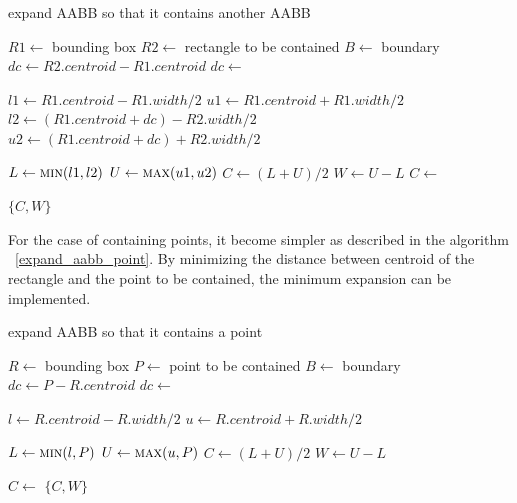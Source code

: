 \documentclass[10pt,letterpaper,twocolumn]{article}
\begin{document}
\begin{algorithm}
    \caption{expand AABB so that it contains another AABB}
    \label{expand_aabb_aabb}
    \begin{algorithmic}
        \State $R1 \gets$ bounding box
        \State $R2 \gets$ rectangle to be contained
        \State $B  \gets$ boundary
            \State $dc \gets R2.centroid - R1.centroid$
            \State $dc \gets$ 

            \State $l1 \gets R1.centroid - R1.width / 2$
            \State $u1 \gets R1.centroid + R1.width / 2$
            \State $l2 \gets (R1.centroid + dc) - R2.width / 2$
            \State $u2 \gets (R1.centroid + dc) + R2.width / 2$

            \State $L \gets \Call{min}{l1, l2}$
            \State $U \gets \Call{max}{u1, u2}$
            \State $C \gets (L + U) / 2$
            \State $W \gets U - L$
            \State $C \gets$ 

            \State \Return $\{C, W\}$
        \EndFunction
     \end{algorithmic}
\end{algorithm}

For the case of containing points, it become simpler as described in the
algorithm ~\ref{expand_aabb_point}. By minimizing the distance between centroid
of the rectangle and the point to be contained, the minimum expansion can be
implemented.

\begin{algorithm}
    \caption{expand AABB so that it contains a point}
    \label{expand_aabb_point}
    \begin{algorithmic}
        \State $R \gets$ bounding box
        \State $P \gets$ point to be contained
        \State $B \gets$ boundary
            \State $dc \gets P - R.centroid$
            \State $dc \gets$ 

            \State $l \gets R.centroid - R.width / 2$
            \State $u \gets R.centroid + R.width / 2$

            \State $L \gets \Call{min}{l, P}$
            \State $U \gets \Call{max}{u, P}$
            \State $C \gets (L + U) / 2$
            \State $W \gets U - L$

            \State $C \gets$ 
            \State \Return $\{C, W\}$
        \EndFunction
     \end{algorithmic}
\end{algorithm}
\end{document}
